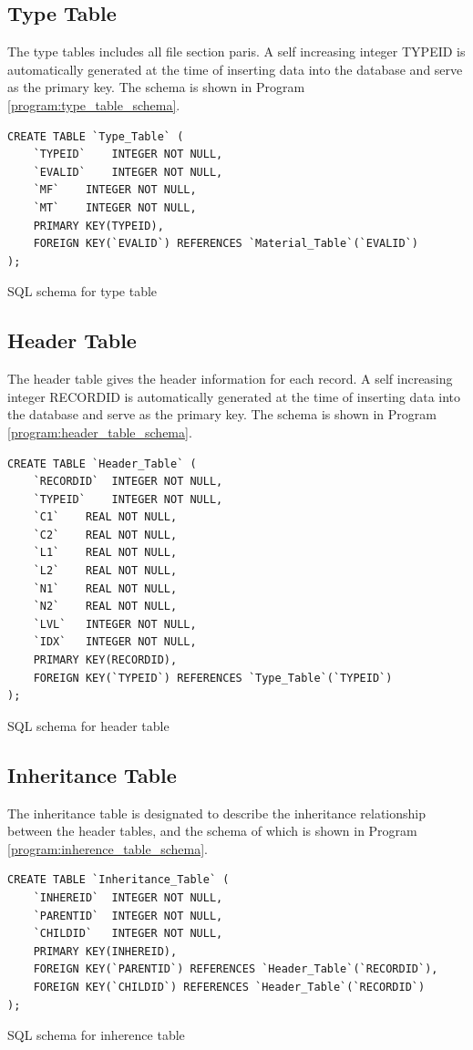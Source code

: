 \subsection{Type Table}
The type tables includes all file section paris. A self increasing integer TYPEID is automatically generated at the time of inserting data into the database and serve as the primary key. The schema is shown in Program \ref{program:type_table_schema}.

\begin{program}[!htb]
\centering
\begin{verbatim} 
CREATE TABLE `Type_Table` (
	`TYPEID`	INTEGER NOT NULL,
	`EVALID`	INTEGER NOT NULL,
	`MF`	INTEGER NOT NULL,
	`MT`	INTEGER NOT NULL,
	PRIMARY KEY(TYPEID),
	FOREIGN KEY(`EVALID`) REFERENCES `Material_Table`(`EVALID`)
);
\end{verbatim}
\caption{ \label{program:type_table_schema}
SQL schema for type table}
\end{program}

\subsection{Header Table}
The header table gives the header information for each record. A self increasing integer RECORDID is automatically generated at the time of inserting data into the database and serve as the primary key. The schema is shown in Program \ref{program:header_table_schema}.
\begin{program}[!htb]
\centering
\begin{verbatim} 
CREATE TABLE `Header_Table` (
	`RECORDID`	INTEGER NOT NULL,
	`TYPEID`	INTEGER NOT NULL,
	`C1`	REAL NOT NULL,
	`C2`	REAL NOT NULL,
	`L1`	REAL NOT NULL,
	`L2`	REAL NOT NULL,
	`N1`	REAL NOT NULL,
	`N2`	REAL NOT NULL,
	`LVL`	INTEGER NOT NULL,
	`IDX`	INTEGER NOT NULL,
	PRIMARY KEY(RECORDID),
	FOREIGN KEY(`TYPEID`) REFERENCES `Type_Table`(`TYPEID`)
);
\end{verbatim}
\caption{ \label{program:header_table_schema}
SQL schema for header table}
\end{program}

\subsection{Inheritance Table}
The inheritance table is designated to describe the inheritance relationship between the header tables, and the schema of which is shown in Program \ref{program:inherence_table_schema}.
\begin{program}[!htb]
\centering
\begin{verbatim} 
CREATE TABLE `Inheritance_Table` (
	`INHEREID`	INTEGER NOT NULL,
	`PARENTID`	INTEGER NOT NULL,
	`CHILDID`	INTEGER NOT NULL,
	PRIMARY KEY(INHEREID),
	FOREIGN KEY(`PARENTID`) REFERENCES `Header_Table`(`RECORDID`),
	FOREIGN KEY(`CHILDID`) REFERENCES `Header_Table`(`RECORDID`)
);
\end{verbatim}
\caption{ \label{program:inherence_table_schema}
SQL schema for inherence table}
\end{program}

